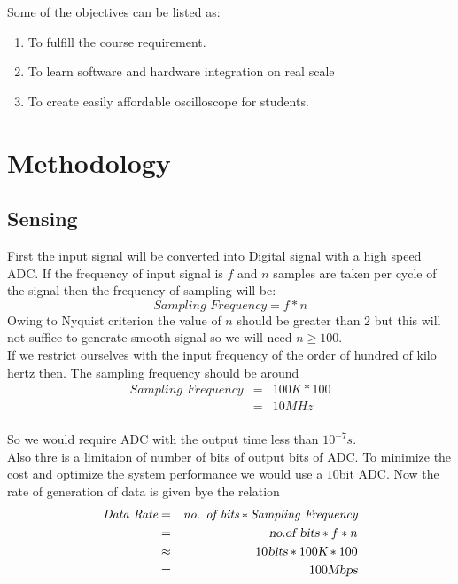 \documentclass[12pt,a4paper]{article}
\begin{document}
Some of the objectives can be listed as:\\
\begin{enumerate}
\item To fulfill the course requirement.
\item To learn software and hardware integration on real scale
\item To create easily affordable oscilloscope for students.
\end{enumerate}

\section{Methodology}


\subsection{Sensing}
First the input signal will be converted into Digital signal with a high speed ADC. If the frequency of input signal is $f$ and $n$ samples are taken per cycle of the signal then the frequency of sampling will be:
\begin{equation}
	\textit{Sampling Frequency}= f*n
\end{equation}
Owing to Nyquist criterion the value of $n$  should be greater than $2$ but this will not suffice to generate smooth signal so we will need $n\geq 100$.\\

If we restrict ourselves with the input frequency of the order of hundred of kilo hertz then. The sampling frequency should be around
\begin{eqnarray*}
 \textit{Sampling Frequency}&=&100K*100\\
 &=& 10MHz\\
\end{eqnarray*}

So we would require ADC with the output time less than $10^{-7}s$. \\

Also thre is a limitaion of number of bits of output bits of ADC. To minimize the cost and optimize the system performance we would use a $10$bit ADC. Now the rate of generation of data is given bye the relation \\
\begin{eqnarray*}
\textit{Data Rate}&=&\textit{no. of bits}*\textit{Sampling Frequency}\\
&=& \textsl{no.of bits}*f*n\\
& \approx &10\textsl{bits}*100\textsl{K}*100\\
&=&100\textsl{Mbps}
\end{eqnarray*}
\end{document}
